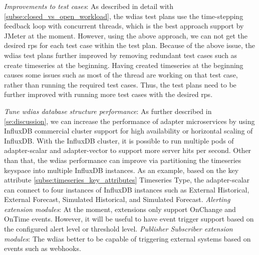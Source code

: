 \emph{Improvements to test cases}:
As described in detail with \cref{subse:closed_vs_open_workload}, the \acrshort{wdias} test plans use the time-stepping feedback loop with concurrent threads, which is the best approach support by JMeter at the moment. However, using the above approach, we can not get the desired \acrshort{rps} for each test case within the test plan.
Because of the above issue, the \acrshort{wdias} test plans further improved by removing redundant test cases such as create timeseries at the beginning. Having created timeseries at the beginning causes some issues such as most of the thread are working on that test case, rather than running the required test cases. Thus, the test plans need to be further improved with running more test cases with the desired \acrshort{rps}.

\emph{Tune \acrshort{wdias} database structure performance}:
As further described in \cref{se:discussion}, we can increase the performance of adapter microservices by using InfluxDB commercial cluster support for high availability or horizontal scaling of InfluxDB. With the InfluxDB cluster, it is possible to run multiple pods of adapter-scalar and adapter-vector to support more server hits per second. Other than that, the \acrshort{wdias} performance can improve via partitioning the timeseries keyspace into multiple InfluxDB instances. As an example, based on the key attribute \cref{subse:timeseries_key_attributes} Timeseries Type, the adapter-scalar can connect to four instances of InfluxDB instances such as External Historical, External Forecast, Simulated Historical, and Simulated Forecast.
\emph{Alerting extension modules}: At the moment, extensions only support OnChange and OnTime events. However, it will be useful to have event trigger support based on the configured alert level or threshold level. 
\emph{Publisher Subscriber extension modules}: The \acrshort{wdias} better to be capable of triggering external systems based on events such as webhooks.
